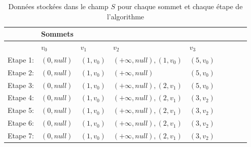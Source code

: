 \begin{exemple}
\begin{figure}[ht!]
\end{figure}

	
\setlength{\overfullrule}{0pt}

\begin{table}[]
	
\caption{Données stockées dans le champ $S$ pour chaque sommet et chaque étape de l'algorithme}
\label{tab:filePrior}

\begin{tabular}{l|l|l|l|l|l|l|l|l|}
\cline{2-5}
                               & Sommets &    &    &      \\ \hline
\multicolumn{1}{|l|}{}         & $v_{0}$ &$v_{1}$  & $v_{2}$ &$v_{3}$  \\ \hline
\multicolumn{1}{|l|}{Etape 1:} & $(0,null)$   &$(1,v_{0})$     &$(+\infty,null),(1,v_{0})$        &$(5,v_{0})$    \\ \hline
\multicolumn{1}{|l|}{Etape 2:} &$(0,null)$         &$(1,v_{0})$    &$(+\infty,null)$              &$(5,v_{0})$     \\ \hline
\multicolumn{1}{|l|}{Etape 3:} &$(0,null)$         &$(1,v_{0})$    &$(+\infty,null),(2,v_{1})$    &$(5,v_{0})$  \\ \hline
\multicolumn{1}{|l|}{Etape 4:} &$(0,null)$         &$(1,v_{0})$    &$(+\infty,null),(2,v_{1})$    &$(3,v_{2})$   \\ \hline
\multicolumn{1}{|l|}{Etape 5:}   &$(0, null)$         &$(1,v_{0})$    &$(+\infty,null),(2,v_{1})$    &$(3,v_{2})$    \\ \hline 
\multicolumn{1}{|l|}{Etape 6:}   &$(0,null)$         &$(1,v_{0})$    &$(+\infty,null),(2,v_{1})$    &$(3,v_{2})$     \\ \hline
\multicolumn{1}{|l|}{Etape 7:}   &$(0, null)$         &$(1,v_{0})$    &$(+\infty,null),(2,v_{1})$    &$(3,v_{2})$   \\ \hline


\end{tabular}
\end{table}
\end{exemple}
